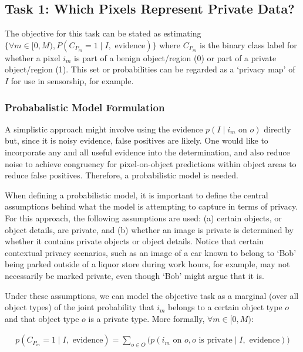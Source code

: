 \documentclass[11pt]{article}
\begin{document}
\subsection{Task 1: Which Pixels Represent Private Data?}

The objective for this task can be stated as estimating $\{\forall m \in \lbrack0,M), P(C_{P_{m}} = 1 \mid I, \textrm{ evidence}) \}$ where $C_{P_m}$ is the binary class label for whether a pixel $i_m$ is part of a benign object/region (0) or part of a private object/region (1).  This set or probabilities can be regarded as a `privacy map' of $I$ for use in sensorship, for example.

\subsubsection{Probabalistic Model Formulation}

A simplistic approach might involve using the evidence $p(I \mid i_{m} \textrm{ on } o)$ directly but, since it is noisy evidence, false positives are likely.  One would like to incorporate any and all useful evidence into the determination, and also reduce noise to achieve congruency for pixel-on-object predictions within object areas to reduce false positives. Therefore, a probabilistic model is needed.

When defining a probabilistic model, it is important to define the central assumptions behind what the model is attempting to capture in terms of privacy. For this approach, the following assumptions are used: (a) certain objects, or object details, are private, and (b) whether an image is private is determined by whether it contains private objects or object details.  Notice that certain contextual privacy scenarios, such as an image of a car known to belong to `Bob' being parked outside of a liquor store during work hours, for example, may not necessarily be marked private, even though `Bob' might argue that it is.

Under these assumptions, we can model the objective task as a marginal (over all object types) of the joint probability that $i_m$ belongs to a certain object type $o$ and that object type $o$ is a private type. More formally, $\forall m \in \lbrack0,M)$:

\begin{align}\label{eqn:task1.0}
    p(C_{P_{m}} = 1 \mid I, \textrm{ evidence}) = \sum_{o \in O} \Big( p(i_m \textrm{ on } o, o \textrm{ is private} \mid I, \textrm{ evidence}) \Big)
\end{align}
\end{document}
